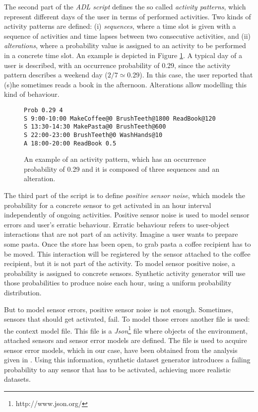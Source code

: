 The second part of the \textit{ADL script} defines the so called \textit{activity patterns}, which represent different days of the user in terms of performed activities. Two kinds of activity patterns are defined: (i) \textit{sequences}, where a time slot is given with a sequence of activities and time lapses between two consecutive activities, and (ii) \textit{alterations}, where a probability value is assigned to an activity to be performed in a concrete time slot. An example is depicted in Figure \ref{fig:activity-pattern}. A typical day of a user is described, with an occurrence probability of 0.29, since the activity pattern describes a weekend day ($2/7 \simeq 0.29$). In this case, the user reported that (s)he sometimes reads a book in the afternoon. Alterations allow modelling this kind of behaviour.

\begin{figure}
\begin{small}
\begin{lstlisting}
Prob 0.29 4
S 9:00-10:00 MakeCoffee@0 BrushTeeth@1800 ReadBook@120
S 13:30-14:30 MakePasta@0 BrushTeeth@600
S 22:00-23:00 BrushTeeth@0 WashHands@10
A 18:00-20:00 ReadBook 0.5
\end{lstlisting}
\end{small}
\caption{An example of an activity pattern, which has an occurrence probability of 0.29 and it is composed of three sequences and an alteration.}
\label{fig:activity-pattern}
\end{figure}

The third part of the script is to define \textit{positive sensor noise}, which models the probability for a concrete sensor to get activated in an hour interval independently of ongoing activities. Positive sensor noise is used to model sensor errors and user's erratic behaviour. Erratic behaviour refers to user-object interactions that are not part of an activity. Imagine a user wants to prepare some pasta. Once the store has been open, to grab pasta a coffee recipient has to be moved. This interaction will be registered by the sensor attached to the coffee recipient, but it is not part of the activity. To model sensor positive noise, a probability is assigned to concrete sensors. Synthetic activity generator will use those probabilities to produce noise each hour, using a uniform probability distribution. 

But to model sensor errors, positive sensor noise is not enough. Sometimes, sensors that should get activated, fail. To model those errors another file is used: the context model file. This file is a \textit{Json}\footnote{http://www.json.org/} file where objects of the environment, attached sensors and sensor error models are defined. The file is used to acquire sensor error models, which in our case, have been obtained from the analysis given in \cite{Chen2012a}. Using this information, synthetic dataset generator introduces a failing probability to any sensor that has to be activated, achieving more realistic datasets. %

